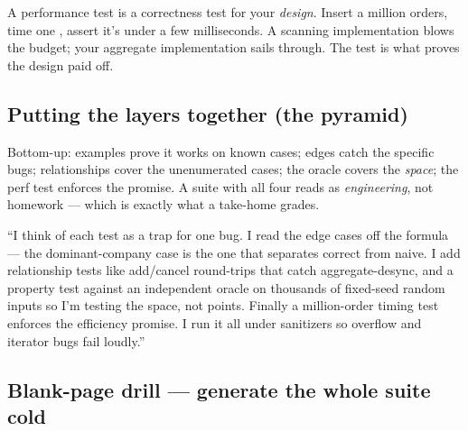 \begin{intu}
A performance test is a correctness test for your \emph{design}. Insert a million
orders, time one , assert it's under a few
milliseconds. A scanning implementation blows the budget; your aggregate
implementation sails through. The test is what proves the design paid off.
\end{intu}

\subsection{Putting the layers together (the pyramid)}

\begin{center}
\end{center}

\noindent Bottom-up: examples prove it works on known cases; edges catch the
specific bugs; relationships cover the unenumerated cases; the oracle covers the
\emph{space}; the perf test enforces the promise. A suite with all four reads as
\emph{engineering}, not homework --- which is exactly what a take-home grades.

\begin{say}
``I think of each test as a trap for one bug. I read the edge cases off the
formula --- the dominant-company case is the one that separates correct from naive.
I add relationship tests like add/cancel round-trips that catch aggregate-desync,
and a property test against an independent oracle on thousands of fixed-seed random
inputs so I'm testing the space, not points. Finally a million-order timing test
enforces the efficiency promise. I run it all under sanitizers so overflow and
iterator bugs fail loudly.''
\end{say}

\subsection{Blank-page drill --- generate the whole suite cold}

